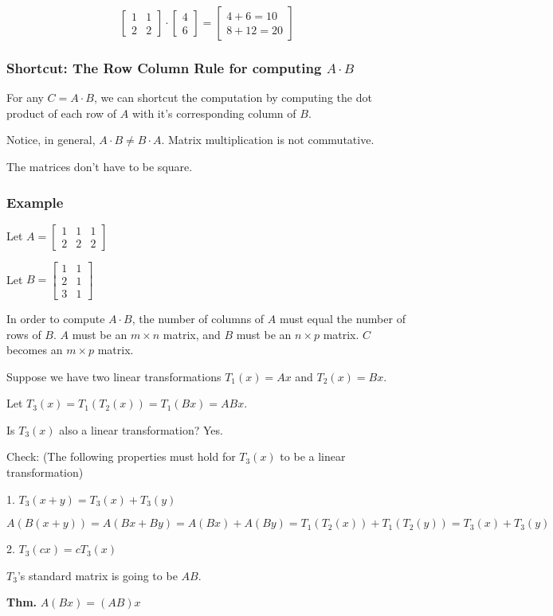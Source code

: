 \documentclass[12pt]{article}
\begin{document}
\begin{equation*}
  \begin{bmatrix}
    1 & 1 \\ 
    2 & 2
  \end{bmatrix}
  \cdot
  \begin{bmatrix}
    4 \\ 6
  \end{bmatrix}
  =
  \begin{bmatrix}
    4 + 6 = 10 \\
    8 + 12 = 20
  \end{bmatrix}
\end{equation*}

\subsubsection{Shortcut: The Row Column Rule for computing $A \cdot B$}

For any $C = A \cdot B$, we can shortcut the computation by computing the
dot product of each row of $A$ with it's corresponding column of $B$.

Notice, in general, $A \cdot B \ne B \cdot A$. Matrix multiplication is not
commutative.

\pagebreak

The matrices don't have to be square.

\subsubsection{Example}

Let $A = \begin{bmatrix}
  1 & 1 & 1 \\
  2 & 2 & 2
\end{bmatrix}$


Let $B = \begin{bmatrix}
  1 & 1 \\
  2 & 1 \\
  3 & 1
\end{bmatrix}$

In order to compute $A \cdot B$, the number of columns of $A$ must equal the
number of rows of $B$. $A$ must be an $m \times n$ matrix, and $B$ must be an
$n \times p$ matrix. $C$ becomes an $m \times p$ matrix.

Suppose we have two linear transformations $T_1(x) = Ax$ and $T_2(x) = Bx$.

Let $T_3(x) = T_1(T_2(x)) = T_1(Bx) = ABx$.

Is $T_3(x)$ also a linear transformation? Yes.

Check: (The following properties must hold for $T_3(x)$ to be a linear
transformation)

1. $T_3(x+y) = T_3(x) + T_3(y)$

$A(B(x+y)) = A(Bx + By) = A(Bx) + A(By) = T_1(T_2(x)) + T_1(T_2(y)) = T_3(x) + T_3(y)$

2. $T_3(cx) = cT_3(x)$

$T_3$'s standard matrix is going to be $AB$.

\textbf{Thm.} $A(Bx) = (AB)x$
\end{document}
